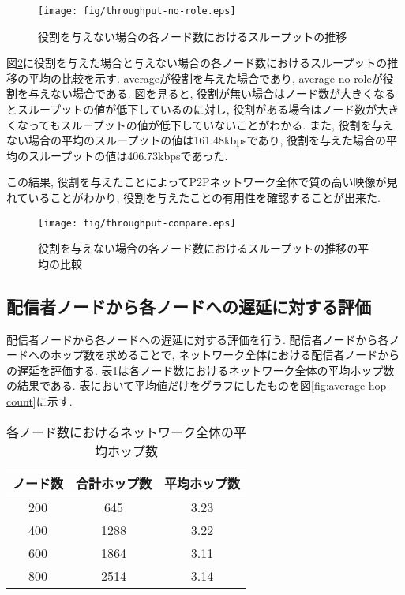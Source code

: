 \begin{figure}[h]
  \centering
  \texttt{[image: fig/throughput-no-role.eps]}
  \caption{役割を与えない場合の各ノード数におけるスループットの推移}
  \label{fig:throughput-no-role}
\end{figure}

\newpage

図\ref{fig:throughput-compare}に役割を与えた場合と与えない場合の各ノード数におけるスループットの推移の平均の比較を示す. averageが役割を与えた場合であり, average-no-roleが役割を与えない場合である. 図を見ると, 役割が無い場合はノード数が大きくなるとスループットの値が低下しているのに対し, 役割がある場合はノード数が大きくなってもスループットの値が低下していないことがわかる. また, 役割を与えない場合の平均のスループットの値は161.48kbpsであり, 役割を与えた場合の平均のスループットの値は406.73kbpsであった.

この結果, 役割を与えたことによってP2Pネットワーク全体で質の高い映像が見れていることがわかり, 役割を与えたことの有用性を確認することが出来た.

\begin{figure}[h]
  \centering
  \texttt{[image: fig/throughput-compare.eps]}
  \caption{役割を与えない場合の各ノード数におけるスループットの推移の平均の比較}
  \label{fig:throughput-compare}
\end{figure}

\newpage

\subsection{配信者ノードから各ノードへの遅延に対する評価}\label{subsec:eval-delay}
配信者ノードから各ノードへの遅延に対する評価を行う. 配信者ノードから各ノードへのホップ数を求めることで, ネットワーク全体における配信者ノードからの遅延を評価する. 表\ref{tbl:hop-count}は各ノード数におけるネットワーク全体の平均ホップ数の結果である. 表において平均値だけをグラフにしたものを図\ref{fig:average-hop-count}に示す.

\begin{table}[h]
  \caption{各ノード数におけるネットワーク全体の平均ホップ数}
  \label{tbl:hop-count}
  \centering
      {\small
        \begin{tabular}{|c|c|c|} \hline
        ノード数 & 合計ホップ数 & 平均ホップ数 \\ \hline \hline
        200 & 645 & 3.23 \\ \hline
        400 & 1288 & 3.22 \\ \hline
        600 & 1864 & 3.11 \\ \hline
        800 & 2514 & 3.14 \\ \hline
        \end{tabular}
      }
\end{table}


